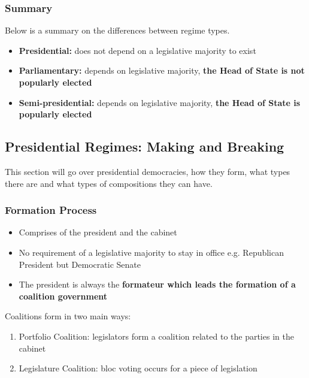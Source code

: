 \documentclass[12pt, letterpaper]{article}
\begin{document}
\subsubsection{Summary}
Below is a summary on the differences between regime types.
\begin{itemize}
	\item \textbf{Presidential:} does not depend on a legislative majority to exist
	\item \textbf{Parliamentary:} depends on legislative majority, \textbf{the Head of State is not popularly elected}
	\item \textbf{Semi-presidential:} depends on legislative majority, \textbf{the Head of State is popularly elected}
\end{itemize}

\subsection{Presidential Regimes: Making and Breaking}
This section will go over presidential democracies, how they form, what types there are and what types of compositions they can have.
\subsubsection{Formation Process}
\begin{itemize}
	\item Comprises of the president and the cabinet
	\item No requirement of a legislative majority to stay in office e.g. Republican President but Democratic Senate
	\item The president is always the \textbf{formateur which leads the formation of a coalition government}
\end{itemize}
Coalitions form in two main ways:
\begin{enumerate}
	\item Portfolio Coalition: legislators form a coalition related to the parties in the cabinet
	\item Legislature Coalition: bloc voting occurs for a piece of legislation
\end{enumerate}
\end{document}
